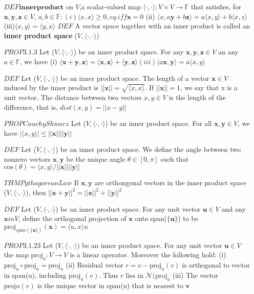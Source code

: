 \documentclass[8pt]{extarticle}
\theoremstyle{definition}
\begin{document}
{\small
$DEF \mathbf{innerproduct}$ on $V$,a scalar-valued map $\langle \cdot,\cdot \rangle: V\times V \to \mathbb{F}$ that satisfies, for $\mathbf{x,y,z} \in V$, $a,b \in \mathbb{F}: (i) \langle x,x \rangle \geq 0, eq. iff \mathbf{x} =0 $
(ii) $\langle x,a \mathbf{y} + b \mathbf{z}  \rangle = a \langle x,y \rangle + b \langle x,z \rangle$
(iii)$ \langle x,y \rangle = \overline { \langle y,x \rangle }$
$DEF$ A vector space together with an inner product is called an \textbf{inner product space} ($V, \langle \cdot,\cdot \rangle$) 

$PROP3.1.3$ Let ($V, \langle \cdot,\cdot \rangle$) be an inner product space. For any $\mathbf{x,y,z} \in V$ an any $a \in \mathbb{F}$, we have (i)
$\langle \mathbf{x + y},\mathbf{z} \rangle  = \langle \mathbf{x},\mathbf{z} \rangle + \langle \mathbf{y},\mathbf{z} \rangle 
(iii) \langle a \mathbf{x},\mathbf{y} \rangle = \overline a \langle x,y \rangle$

$DEF$ Let ($V, \langle \cdot,\cdot \rangle$) be an inner product space. The length of a vector $\mathbf{x} \in V$ induced by the inner product is $|| \mathbf{x} || = \sqrt{ \langle x,x \rangle} $. If $||\mathbf{x} || = 1$, we say that x is a unit vector. The distance between two vectors $x,y \in V$ is the length of the difference, that is, $dist(x,y)=||x-y||$

$PROPCauchyShwarz$ Let ($V, \langle \cdot,\cdot \rangle$) be an inner product space. For all $ \mathbf{x,y} \in V$, we have $| \langle x,y \rangle | \leq ||\mathbf{x}||||\mathbf{y}||$

$DEF$ Let ($V, \langle \cdot,\cdot \rangle$) be an inner product space. We define the angle between two nonzero vectors $\mathbf{x,y}$ be the unique angle $\theta \in [0, \pi]$ such that 
$\text{cos}(\theta) = \langle x,y \rangle / ||\mathbf{x}||||\mathbf{y}||$

$THMPythagoreanLaw$ If $\mathbf{x,y}$ are orthongonal vectors in the inner product space ($V, \langle \cdot,\cdot \rangle$), then $||\mathbf{x + y}||^2 = ||\mathbf{x}||^2 + ||\mathbf{y}||^2$

$DEF$  Let ($V, \langle \cdot,\cdot \rangle$) be an inner product space. For any unit vector $\mathbf{u}\in V$ and any $\mathbf{x} in V$, define the orthogonal projection of $\mathbf{x}$ onto span($\{\mathbf{u}\}$) to be $\text{proj}_{span(\{\mathbf{u}\})}(\mathbf{x}) = \langle u,x \rangle u$

$PROP 3.1.23$ Let ($V, \langle \cdot,\cdot \rangle$) be an inner product space. For any unit vector $\mathbf{u} \in V$ the map $\text{proj}_u: V \to V$ is a linear operator. Moreover the following hold:
(i) $\text{proj}_u \circ \text{proj}_u =  \text{proj}_u $ 
(ii) Residual vector $r = v - \text{proj}_u(v)$  is orthogonal to vector in span(u), including $\text{proj}_u(v)$. Thus $r$ lies in $\mathscr{N}(\text{proj}_u$
(iii) The vector $\text{proj}u(v)$ is the unique vector in span(u) that is nearest to $\mathbf{v}$

}
\end{document}
